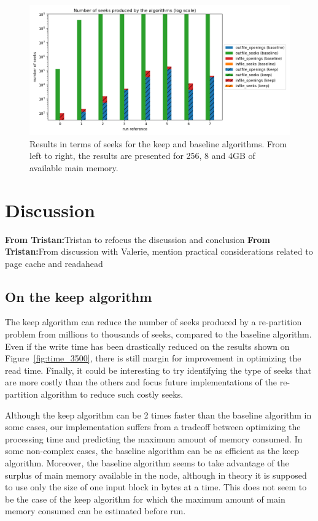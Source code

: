 \documentclass[sigconf, nonacm]{acmart}
\newcommand{\tristan}[1]{\color{orange}\textbf{From Tristan:}#1\color{black}}
\begin{document}
\begin{figure}[h]
    \centering
    \includegraphics[scale=0.36]{./figures/seeks_8000.png}
    \caption{Results in terms of seeks for the keep and baseline algorithms. From left to right, the results are presented for 256, 8 and 4GB of available main memory.}
    \label{fig:seeks_8000}
\end{figure}

\section{Discussion}
\tristan{Tristan to refocus the discussion and conclusion}
\tristan{From discussion with Valerie, mention practical considerations related to page cache and readahead}

\subsection{On the keep algorithm}
The keep algorithm can reduce the number of seeks produced by a re-partition
problem from millions to thousands of seeks, compared to the baseline algorithm.
Even if the write time has been drastically reduced on the results shown on
Figure~\ref{fig:time_3500}, there is still margin for improvement in optimizing
the read time.
Finally, it could be interesting to try identifying the type of seeks that are
more costly than the others and focus future implementations of the re-partition
algorithm to reduce such costly seeks.

Although the keep algorithm can be 2 times faster than the baseline algorithm
in some cases, our implementation suffers from a tradeoff between optimizing
the processing time and predicting the maximum amount of memory consumed.
In some non-complex cases, the baseline algorithm can be as efficient as the
keep algorithm.
Moreover, the baseline algorithm seems to take advantage of the surplus of
main memory available in the node, although in theory it is supposed to use
only the size of one input block in bytes at a time.
This does not seem to be the case of the keep algorithm for which the maximum
amount of main memory consumed can be estimated before run.
\end{document}
